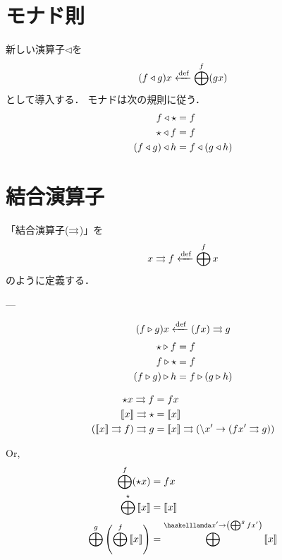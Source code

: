 \documentclass[twocolumn]{jsbook}
\newcommand{\listtype}[1]{\left[#1\right]}
\begin{document}



\section{モナド則}

新しい演算子$\triangleleft$を$$(f\triangleleft g)x\xleftarrow{\text{def}}\bigoplus^f(gx)$$として導入する．
モナドは次の規則に従う．
\begin{align}
f\triangleleft\star&=f\\
\star\triangleleft f&=f\\
(f\triangleleft g)\triangleleft h&=f\triangleleft(g\triangleleft h)
\end{align}

\section{結合演算子}

「結合演算子($\rightrightarrows$)」を$$x\rightrightarrows f\xleftarrow{\text{def}} \bigoplus^fx$$のように定義する．

---

$$(f\triangleright g)x\xleftarrow{\text{def}}(fx)\rightrightarrows g$$
\begin{align}
\star\triangleright f&=f\\
f\triangleright\star&=f\\
(f\triangleright g)\triangleright h&=f\triangleright(g\triangleright h)
\end{align}

\begin{align}
\unit x\bind f&=fx\\
\monad{x}\bind\unit&=\monad{x}\\
(\monad{x}\bind f)\bind g&=\monad{x}\bind(\haskelllambda x'\rightarrow(fx'\bind g))
\end{align}

Or,
\begin{align}
\monadfunc^f(\unit x)&=fx\\
\monadfunc^\unit\monad{x}&=\monad{x}\\
\monadfunc^g\left(\monadfunc^f\monad{x}\right)&=\monadfunc^{\haskelllamda x'\rightarrow\left(\monadfunc^gfx'\right)}\monad{x}
\end{align}
\end{document}
